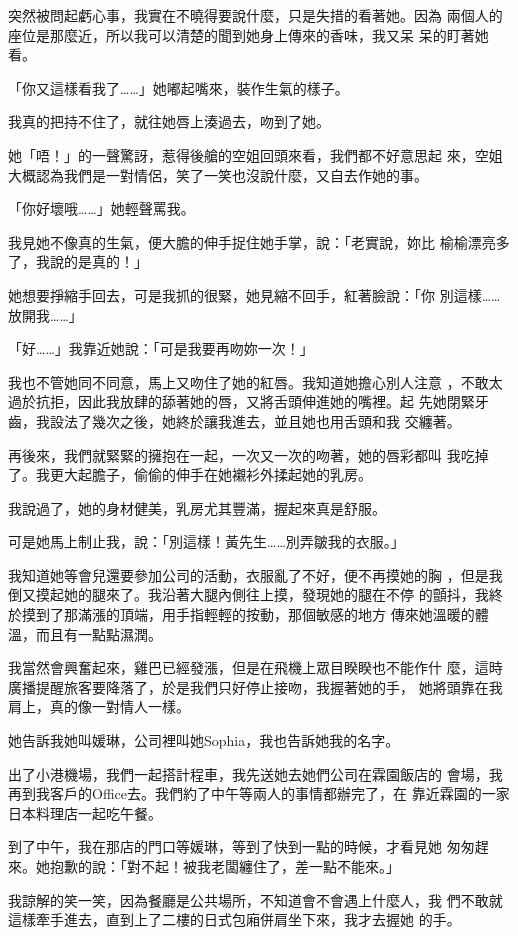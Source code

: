 突然被問起虧心事，我實在不曉得要說什麼，只是失措的看著她。因為
兩個人的座位是那麼近，所以我可以清楚的聞到她身上傳來的香味，我又呆
呆的盯著她看。

「你又這樣看我了……」她嘟起嘴來，裝作生氣的樣子。

我真的把持不住了，就往她唇上湊過去，吻到了她。

她「唔！」的一聲驚訝，惹得後艙的空姐回頭來看，我們都不好意思起
來，空姐大概認為我們是一對情侶，笑了一笑也沒說什麼，又自去作她的事。

「你好壞哦……」她輕聲罵我。

我見她不像真的生氣，便大膽的伸手捉住她手掌，說：「老實說，妳比
榆榆漂亮多了，我說的是真的！」


她想要掙縮手回去，可是我抓的很緊，她見縮不回手，紅著臉說：「你
別這樣……放開我……」

「好……」我靠近她說：「可是我要再吻妳一次！」

我也不管她同不同意，馬上又吻住了她的紅唇。我知道她擔心別人注意
，不敢太過於抗拒，因此我放肆的舔著她的唇，又將舌頭伸進她的嘴裡。起
先她閉緊牙齒，我設法了幾次之後，她終於讓我進去，並且她也用舌頭和我
交纏著。

再後來，我們就緊緊的擁抱在一起，一次又一次的吻著，她的唇彩都叫
我吃掉了。我更大起膽子，偷偷的伸手在她襯衫外揉起她的乳房。

我說過了，她的身材健美，乳房尤其豐滿，握起來真是舒服。

可是她馬上制止我，說：「別這樣！黃先生……別弄皺我的衣服。」

我知道她等會兒還要參加公司的活動，衣服亂了不好，便不再摸她的胸
，但是我倒又摸起她的腿來了。我沿著大腿內側往上摸，發現她的腿在不停
的顫抖，我終於摸到了那滿漲的頂端，用手指輕輕的按動，那個敏感的地方
傳來她溫暖的體溫，而且有一點點濕潤。

我當然會興奮起來，雞巴已經發漲，但是在飛機上眾目睽睽也不能作什
麼，這時廣播提醒旅客要降落了，於是我們只好停止接吻，我握著她的手，
她將頭靠在我肩上，真的像一對情人一樣。

她告訴我她叫媛琳，公司裡叫她Sophia，我也告訴她我的名字。

出了小港機場，我們一起搭計程車，我先送她去她們公司在霖園飯店的
會場，我再到我客戶的Office去。我們約了中午等兩人的事情都辦完了，在
靠近霖園的一家日本料理店一起吃午餐。

到了中午，我在那店的門口等媛琳，等到了快到一點的時候，才看見她
匆匆趕來。她抱歉的說：「對不起！被我老闆纏住了，差一點不能來。」

我諒解的笑一笑，因為餐廳是公共場所，不知道會不會遇上什麼人，我
們不敢就這樣牽手進去，直到上了二樓的日式包廂併肩坐下來，我才去握她
的手。


